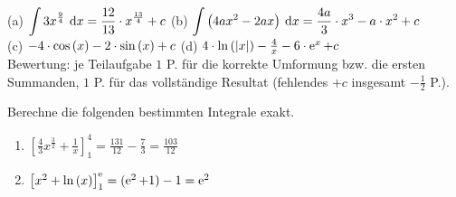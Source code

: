 \documentclass[11pt]{exam}
\begin{document}
\begin{questions}
{\begin{solution}
		(a) $\displaystyle\int3x^{\frac{9}{4}}\:\operatorname{d}\!{x}=\frac{12}{13}\cdot x^{\frac{13}{4}}+c$ \qquad (b) $\displaystyle\int\left(4ax^2-2ax\right)\:\operatorname{d}\!{x}=\frac{4a}{3}\cdot x^3-a\cdot x^2+c$\\
		(c) $-4\*\cos{x}-2\*\sin{x}+c$ \qquad (d) $4\*\ln{|x|}-\frac{4}{x}-6\*\exp{x}+c$\\
		Bewertung: je Teilaufgabe $1$ P. für die korrekte Umformung bzw. die ersten Summanden, $1$ P. für das vollständige Resultat (fehlendes $+c$ insgesamt $-\frac{1}{2}$ P.).
\end{solution}}
{}


\question[6]
Berechne die folgenden bestimmten Integrale exakt.
{\begin{solution}
		\begin{enumerate}[label=\alph*)]
			\item $\left[\frac{4}{3}x^{\frac{3}{2}} + \frac{1}{x}\right]_1^4 = \frac{131}{12} - \frac{7}{3} = \frac{103}{12}$
			\item $\left[x^2 + \ln{x}\right]_1^{\e} = (\exp{2} + 1) - 1 = \exp{2}$
		\end{enumerate}
\end{solution}}
{}




\end{questions}
\end{document}
